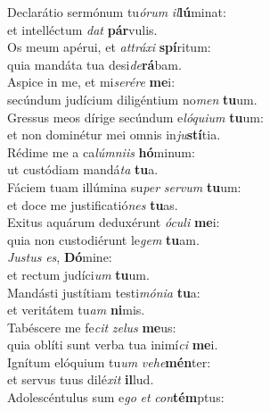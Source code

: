 \evenverse Declarátio sermónum tu\textit{ó}\textit{rum} \textit{il}\textbf{lú}minat:~\*\\
\evenverse et intelléctum \textit{dat} \textbf{pár}vulis.\\
\oddverse Os meum apérui, et \textit{at}\textit{trá}\textit{xi} \textbf{spí}ritum:~\*\\
\oddverse quia mandáta tua desi\textit{de}\textbf{rá}bam.\\
\evenverse Aspice in me, et mi\textit{se}\textit{ré}\textit{re} \textbf{me}i:~\*\\
\evenverse secúndum judícium diligéntium no\textit{men} \textbf{tu}um.\\
\oddverse Gressus meos dírige secúndum e\textit{ló}\textit{qui}\textit{um} \textbf{tu}um:~\*\\
\oddverse et non dominétur mei omnis in\textit{ju}\textbf{stí}tia.\\
\evenverse Rédime me a ca\textit{lúm}\textit{ni}\textit{is} \textbf{hó}minum:~\*\\
\evenverse ut custódiam mandá\textit{ta} \textbf{tu}a.\\
\oddverse Fáciem tuam illúmina su\textit{per} \textit{ser}\textit{vum} \textbf{tu}um:~\*\\
\oddverse et doce me justificatió\textit{nes} \textbf{tu}as.\\
\evenverse Exitus aquárum deduxérunt \textit{ó}\textit{cu}\textit{li} \textbf{me}i:~\*\\
\evenverse quia non custodiérunt le\textit{gem} \textbf{tu}am.\\
\oddverse \textit{Ju}\textit{stus} \textit{es}, \textbf{Dó}mine:~\*\\
\oddverse et rectum judíci\textit{um} \textbf{tu}um.\\
\evenverse Mandásti justítiam testi\textit{mó}\textit{ni}\textit{a} \textbf{tu}a:~\*\\
\evenverse et veritátem tu\textit{am} \textbf{ni}mis.\\
\oddverse Tabéscere me fe\textit{cit} \textit{ze}\textit{lus} \textbf{me}us:~\*\\
\oddverse quia oblíti sunt verba tua inimí\textit{ci} \textbf{me}i.\\
\evenverse Ignítum elóquium tu\textit{um} \textit{ve}\textit{he}\textbf{mén}ter:~\*\\
\evenverse et servus tuus dilé\textit{xit} \textbf{il}lud.\\
\oddverse Adolescéntulus sum e\textit{go} \textit{et} \textit{con}\textbf{tém}ptus:~\*\\

